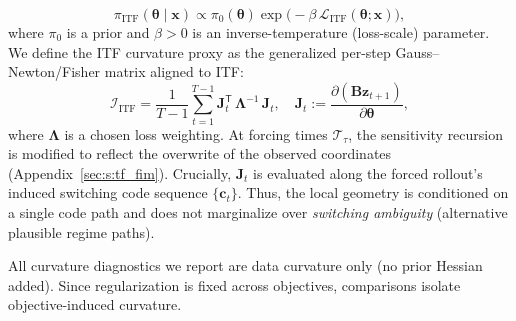 \documentclass[twoside]{article}
\theoremstyle{plain}
\theoremstyle{definition}
\theoremstyle{remark}
\begin{document}
\begin{equation}
\label{eq:gibbs}
\pi_{\mathrm{ITF}}(\bm\theta\mid\bm x)
\propto
\pi_0(\bm\theta)\exp\!\big(-\beta\,\mathcal L_{\mathrm{ITF}}(\bm\theta;\bm x)\big),
\end{equation}
where $\pi_0$ is a prior and $\beta>0$ is an inverse-temperature (loss-scale) parameter. We define the ITF curvature proxy as the generalized per-step Gauss–Newton/Fisher matrix aligned to ITF:
\begin{equation}
\label{eq:tfgn}
\bm{\mathcal{I}}_{\mathrm{ITF}}
=
\frac{1}{T-1}\sum_{t=1}^{T-1}
\bm{J}_t^{\mathsf T}\,\bm{\Lambda}^{-1}\,\bm{J}_t,
\quad
\bm{J}_t:=\frac{\partial(\bm{B}\bm{z}_{t+1})}{\partial\bm\theta},
\end{equation}
where $\bm{\Lambda}$ is a chosen loss weighting. 
At forcing times $\mathcal{T}_\tau$, the sensitivity recursion is modified to reflect the overwrite of the observed coordinates (Appendix~\ref{sec:s:tf_fim}). Crucially, $\bm J_t$ is evaluated along the forced rollout’s induced switching code sequence $\{\bm c_t\}$. Thus, the local geometry is conditioned on a single code path and does not marginalize over \emph{switching ambiguity} (alternative plausible regime paths).

All curvature diagnostics we report are data curvature only (no prior Hessian added). Since regularization is fixed across objectives, comparisons isolate objective-induced curvature.
\end{document}
